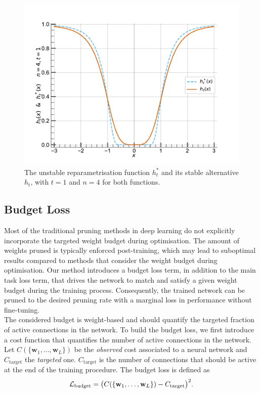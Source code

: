 \begin{figure}
  \centering
  \centerline{\includegraphics[width=0.49\linewidth]{chapter_1/assets/h_stable_vs_unstable.pdf}}
  \caption{ The unstable reparametrisation function $h_t^*$ and its
    stable alternative $h_t$, with $t=1$ and $n=4$ for both functions.}
  \label{fig:chap1:h_stable_vs_unstable}
\end{figure}

\subsection{Budget Loss}
\label{sec:chap1:budget_loss}
Most of the traditional pruning methods in deep learning do not explicitly
incorporate the targeted weight budget during optimisation. The amount of
weights pruned is typically enforced post-training, which may lead to suboptimal
results compared to methods that consider the weight budget during optimisation.
Our method introduces a budget loss term, in addition to the main task loss
term, that drives the network to match and satisfy a given weight budget during
the training process. Consequently, the trained network can be pruned to the
desired pruning rate with a marginal loss in performance without fine-tuning.\\


The considered budget is weight-based and should quantify the targeted fraction
of active connections in the network. To build the budget loss, we first
introduce a cost function that quantifies the number of active connections in
the network. Let $C(\{\mathbf{w}_1,\dots, \mathbf{w}_L\})$ be the {\em observed}
cost associated to a neural network and $C_\text{target}$ the {\em targeted}
one. $C_\text{target}$ is the number of connections that should be active at the
end of the training procedure. The budget loss is defined as \\

\begin{equation}
  \label{eqn:chap1:simple_budget}
  {\cal L}_\text{budget} = \bigl( C(\{\mathbf{w}_1,\dots, \mathbf{w}_L\}) - C_\text{target} \bigr)^2.
\end{equation} \\


